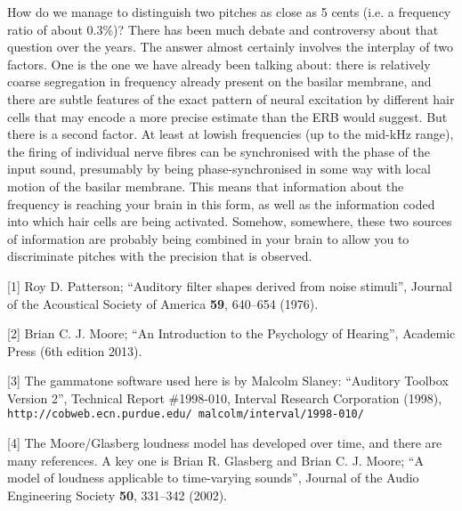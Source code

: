   How do we manage to distinguish two pitches as close as 5 cents (i.e. a 
  frequency ratio of about 0.3\%)? There has been much debate and controversy 
  about that question over the years. The answer almost certainly involves the 
  interplay of two factors. One is the one we have already been talking about: 
  there is relatively coarse segregation in frequency already present on the 
  basilar membrane, and there are subtle features of the exact pattern of 
  neural excitation by different hair cells that may encode a more precise 
  estimate than the ERB would suggest. But there is a second factor. At least 
  at lowish frequencies (up to the mid-kHz range), the firing of individual 
  nerve fibres can be synchronised with the phase of the input sound, 
  presumably by being phase-synchronised in some way with local motion of the 
  basilar membrane. This means that information about the frequency is reaching 
  your brain in this form, as well as the information coded into which hair 
  cells are being activated. Somehow, somewhere, these two sources of 
  information are probably being combined in your brain to allow you to 
  discriminate pitches with the precision that is observed. 



  \sectionreferences{}[1] Roy D. Patterson; ``Auditory filter shapes derived 
  from noise stimuli'', Journal of the Acoustical Society of America 
  \textbf{59}, 640--654 (1976). 

  [2] Brian C. J. Moore; ``An Introduction to the Psychology of Hearing'', 
  Academic Press (6th edition 2013). 

  [3] The gammatone software used here is by Malcolm Slaney: ``Auditory Toolbox 
  Version 2'', Technical Report \#1998-010, Interval Research Corporation 
  (1998), \tt{}http://cobweb.ecn.purdue.edu/~malcolm/interval/1998-010/\rm{} 

  [4] The Moore/Glasberg loudness model has developed over time, and there are 
  many references. A key one is Brian R. Glasberg and Brian C. J. Moore; “A 
  model of loudness applicable to time-varying sounds”, Journal of the Audio 
  Engineering Society \textbf{50}, 331--342 (2002). 